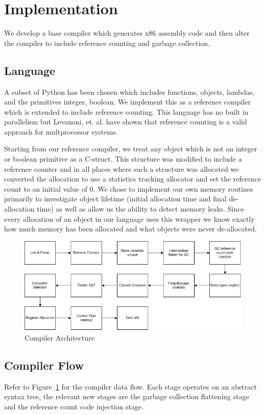 \documentclass{sigplanconf}
\begin{document}
\section{Implementation}
We develop a base compiler which generates x86 assembly code and then alter the compiler to include reference counting and garbage collection.
\subsection{Language}
A subset of Python has been chosen which includes functions, objects, lambdas, and the primitives integer, boolean.  We implement this as a reference compiler which is extended to include reference counting.  This language has no built in parallelism but Levanoni, et. al. have shown that reference counting is a valid approach for multprocessor systems.\cite{levanoni}
\par
Starting from our reference compiler, we treat any object which is not an integer or boolean primitive as a C-struct.  This structure was modified to include a reference counter and in all places where such a structure was allocated we converted the allocation to use a statistics tracking allocator and set the reference count to an initial value of 0.
We chose to implement our own memory routines primarily to investigate object lifetime (initial allocation time and final de-allocation time) as well as allow us the ability to detect memory leaks.  Since every allocation of an object in our language uses this wrapper we know exactly how much memory has been allocated and what objects were never de-allocated.
\begin{figure}
\begin{center}
\includegraphics[scale=0.48]{compiler_flow.png}
\end{center}
\caption{Compiler Architecture}
\label{fig-comparch}
\end{figure}

\subsection{Compiler Flow}
Refer to Figure~\ref{fig-comparch} for the compiler data flow.  Each stage operates on an abstract syntax tree, the relevant new stages are the garbage collection flattening stage and the reference count code injection stage.
\end{document}
